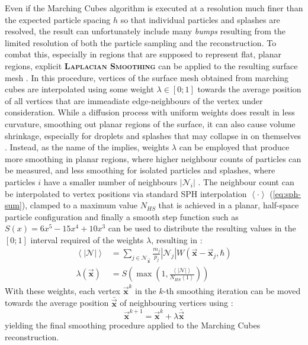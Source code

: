 \documentclass[oneside, a4paper]{book}
\newcommand\emphasis[1]{{\scshape\bfseries#1}}
\newcommand\abs[1]{\left|#1\right|}
\newcommand\angled[1]{\left\langle#1\right\rangle}
\newcommand\vek[1]{\vec{\bm{#1}}}
\newcommand\br[1]{\left(#1\right)}
\begin{document}
  Even if the Marching Cubes algorithm is executed at a resolution much finer than the expected particle spacing $h$ so that individual particles and splashes are resolved, the result can unfortunately include many \textit{bumps} resulting from the limited resolution of both the particle sampling and the reconstruction. To combat this, especially in regions that are supposed to represent flat, planar regions, explicit \emphasis{Laplacian Smoothing} can be applied to the resulting surface mesh \autocite{laplacian-surf-reconst}. In this procedure, vertices of the surface mesh obtained from marching cubes are interpolated using some weight $\lambda\in[0;1]$ towards the average position of all vertices that are immeadiate edge-neighbours of the vertex under consideration. While a diffusion process with uniform weights does result in less curvature, smoothing out planar regions of the surface, it can also cause volume shrinkage, especially for droplets and splashes that may collapse in on themselves \autocite{laplacian-surf-reconst}. Instead, as the name of the \autocite[Weighted Laplacian Smoothing]{laplacian-surf-reconst} implies, weights $\lambda$ can be employed that produce more smoothing in planar regions, where higher neighbour counts of particles can be measured, and less smoothing for isolated particles and splashes, where particles $i$ have a smaller number of neighbours $\abs{\mathcal{N}_{i}}$ \autocite{laplacian-surf-reconst}. The neighbour count can be interpolated to vertex positions via standard SPH interpolation $\angled{\cdot}$ (\autoref{eq:sph-sum}), clamped to a maximum value $N_{HS}$ that is achieved in a planar, half-space particle configuration and finally a smooth step function such as $S(x)=6x^5-15x^4+10x^3$ can be used to distribute the resulting values in the $[0;1]$ interval required of the weights $\lambda$, resulting in \autocite{laplacian-surf-reconst}:
  \begin{align}
    \angled{\abs{\mathcal{N}}} &= \sum_{j\in\mathcal{N}_{\vek{x}}} \frac{m_j}{p_j} \abs{\mathcal{N}_j} W\br{\vek{x}-\vek{x}_j, \hbar}\\
    \lambda\br{\vek{x}} &= S\br{\max\br{1, \frac{\angled{\abs{\mathcal{N}}}}{N_{HS}\angled{1}}}}
  \end{align}
  With these weights, each vertex $\vek{x}^k$ in the $k$-th smoothing iteration can be moved towards the average position $\bar{\vek{x}}$ of neighbouring vertices using \autocite{laplacian-surf-reconst}:
  \begin{equation}
    \vek{x}^{k+1} = \vek{x}^{k} + \lambda \bar{\vek{x}}
  \end{equation}
  yielding the final smoothing procedure applied to the Marching Cubes reconstruction.
\end{document}
